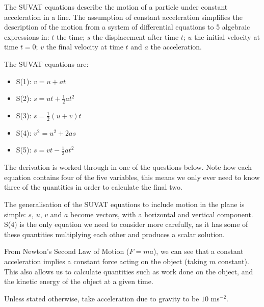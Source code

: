 The SUVAT equations describe the motion of a particle under constant acceleration in a line. The assumption of constant acceleration simplifies the description of the motion from a system of differential equations to 5 algebraic expressions in: $t$ the time; $s$ the displacement after time $t$; $u$ the initial velocity at time $t=0$; $v$ the final velocity at time $t$ and $a$ the acceleration. 

The SUVAT equations are:
\begin{itemize}
	\item S(1): $v = u+at$ 
    \item S(2): $s=ut+\frac{1}{2}at^2$
    \item S(3): $s = \frac{1}{2}(u+v)t$
    \item S(4): $v^2 = u^2 + 2as$
    \item S(5): $s=vt-\frac{1}{2}at^2$
\end{itemize}
The derivation is worked through in one of the questions below. Note how each equation contains four of the five variables, this means we only ever need to know three of the quantities in order to calculate the final two.

The generalisation of the SUVAT equations to include motion in the plane is simple: $s$, $u$, $v$ and $a$ become vectors, with a horizontal and vertical component. S(4) is the only equation we need to consider more carefully, as it has some of these quantities multiplying each other and produces a scalar solution.

From Newton's Second Law of Motion ($F=ma$), we can see that a constant acceleration implies a constant force acting on the object (taking $m$ constant). This also allows us to calculate quantities such as work done on the object, and the kinetic energy of the object at a given time.

Unless stated otherwise, take acceleration due to gravity to be $10$ ms$^{-2}$.